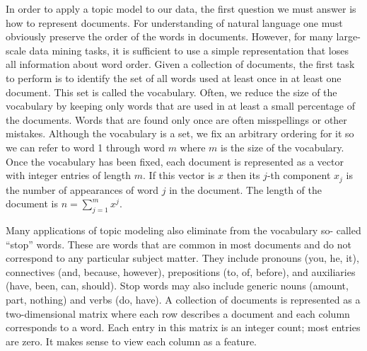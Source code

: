 \documentclass[12pt]{report}
\begin{document}
In order to apply a topic model to our data, the first question we must answer
is how to represent documents. For understanding of natural language one must
obviously preserve the order of the words in documents. However, for many
large-scale data mining tasks, it is sufficient to use a simple representation
that loses all information about word order. Given a collection of documents,
the first task to perform is to identify the set of all words used at least
once in at least one document. This set is called the vocabulary. Often, we
reduce the size of the vocabulary by keeping only words that are used in at
least a small percentage of the documents. Words that are found only once are
often misspellings or other mistakes. Although the vocabulary is a set, we fix
an arbitrary ordering for it so we can refer to word 1 through word $m$ where
$m$ is the size of the vocabulary. Once the vocabulary has been fixed, each
document is represented as a vector with integer entries of length $m$. If this
vector is $x$ then its $j$-th component $x_j$ is the number of appearances of
word $j$ in the document. The length of the document is $n=\sum\limits_{j=1}^m
x^j$.

Many applications of topic modeling also eliminate from the vocabulary so-
called “stop” words. These are words that are common in most documents and do
not correspond to any particular subject matter. They include pronouns (you,
he, it), connectives (and, because, however), prepositions (to, of, before),
and auxiliaries (have, been, can, should). Stop words may also include generic
nouns (amount, part, nothing) and verbs (do, have). A collection of documents
is represented as a two-dimensional matrix where each row describes a document
and each column corresponds to a word. Each entry in this matrix is an integer
count; most entries are zero. It makes sense to view each column as a feature.
\end{document}
